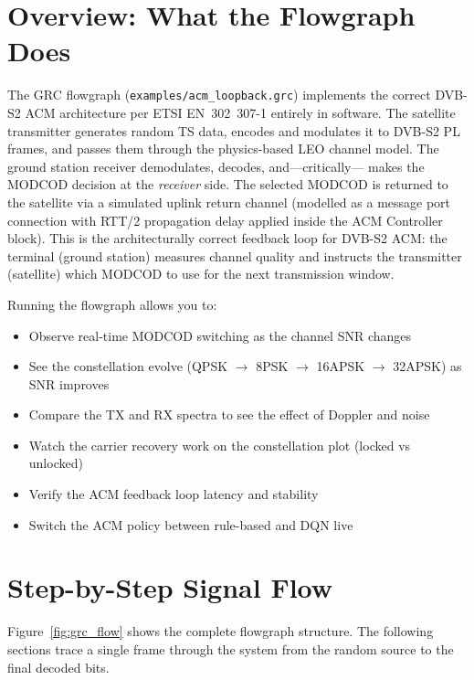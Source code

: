 \documentclass[12pt,a4paper]{report}
\begin{document}
\section{Overview: What the Flowgraph Does}

The GRC flowgraph (\texttt{examples/acm\_loopback.grc}) implements the
correct DVB-S2 ACM architecture per ETSI EN~302~307-1 entirely in software.
The satellite transmitter generates random TS data, encodes and modulates it
to DVB-S2 PL frames, and passes them through the physics-based LEO channel
model.  The ground station receiver demodulates, decodes, and---critically---
makes the MODCOD decision at the \emph{receiver} side.  The selected MODCOD
is returned to the satellite via a simulated uplink return channel (modelled
as a message port connection with RTT/2 propagation delay applied inside the
ACM Controller block).  This is the architecturally correct feedback loop for
DVB-S2 ACM: the terminal (ground station) measures channel quality and
instructs the transmitter (satellite) which MODCOD to use for the next
transmission window.

Running the flowgraph allows you to:
\begin{itemize}
    \item Observe real-time MODCOD switching as the channel SNR changes
    \item See the constellation evolve (QPSK $\to$ 8PSK $\to$ 16APSK $\to$ 32APSK)
          as SNR improves
    \item Compare the TX and RX spectra to see the effect of Doppler and noise
    \item Watch the carrier recovery work on the constellation plot (locked vs
          unlocked)
    \item Verify the ACM feedback loop latency and stability
    \item Switch the ACM policy between rule-based and DQN live
\end{itemize}

\section{Step-by-Step Signal Flow}

Figure~\ref{fig:grc_flow} shows the complete flowgraph structure. The following
sections trace a single frame through the system from the random source to the
final decoded bits.
\end{document}
